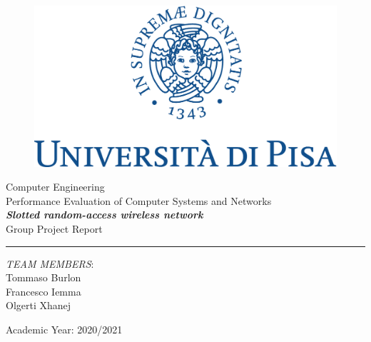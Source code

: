\documentclass[11pt]{article}
\begin{document}
\begin{titlepage}
	\begin{center}
		\begin{figure}
			\includegraphics[width=\textwidth]{img/marchio_unipi_pant541-eps-converted-to.pdf}         
		\end{figure}
		{\Large
			Computer Engineering\\
			\vspace{5mm} %
			Performance Evaluation of Computer Systems and Networks}\\
		\vspace{30mm} %
		{\Huge\textbf{\textit{Slotted random-access wireless network}}}\\
		\vspace{10mm} %
		{\Large Group Project Report}\\
		\par\noindent\rule{\textwidth}{0.4pt}
		\begin{flushright}
			\textit{TEAM MEMBERS}:\\
			Tommaso Burlon\\ 
			Francesco Iemma\\ 
			Olgerti Xhanej\\
			
		\end{flushright}
		\vfill
		Academic Year: 2020/2021\\        
	\end{center}
\end{titlepage} 
\tableofcontents







\end{document}
